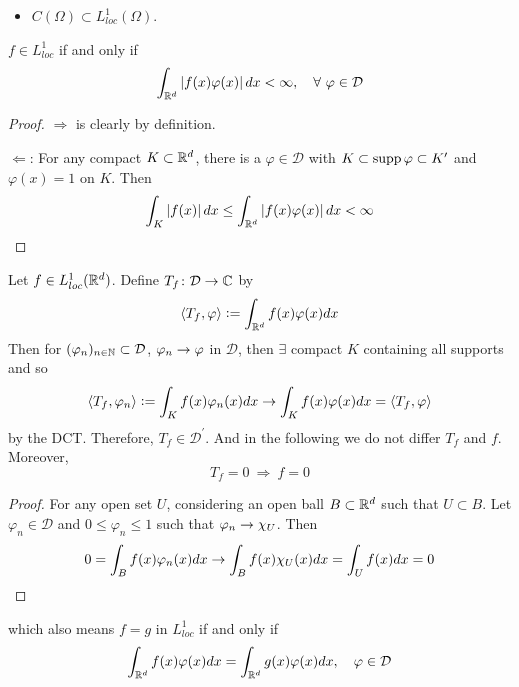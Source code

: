\begin{enumerate}[label=\arabic*.]
\begin{exam}
\begin{itemize}
			\item $C(\Omega) \subset L^1_{loc}(\Omega)$.
		\end{itemize}
		\begin{prop}
			$f \in L^1_{loc}$ if and only if
			\begin{equation*}
				\int_{\mathbb{R}^d}\left\lvert f(x)\varphi(x)\right\lvert dx < \infty,\quad \forall~\varphi \in \mathcal{D}
			\end{equation*}
		\end{prop}
		\begin{proof}
			$\Rightarrow$ is clearly by definition.

			\noindent $\Leftarrow$: For any compact $K \subset \mathbb{R}^d$, there is a $\varphi \in \mathcal{D}$ with $K \subset \operatorname{supp} \varphi \subset K^\prime$ and $\varphi(x) = 1$ on $K$. Then
			\begin{equation*}
				\int_K \left\lvert f(x)\right\lvert dx \leq \int_{\mathbb{R}^d} \left\lvert f(x)\varphi(x)\right\lvert dx < \infty
			\end{equation*}
		\end{proof}

		Let $f \in L^1_{loc}(\mathbb{R}^d)$. Define $T_f \colon \mathcal{D} \rightarrow \mathbb{C}$ by
		\begin{equation*}
			\langle T_f, \varphi \rangle \vcentcolon= \int_{\mathbb{R}^d} f(x)\varphi(x) dx
		\end{equation*}
		Then for $(\varphi_n)_{n \in \mathbb{N}} \subset \mathcal{D}$, $\varphi_n \rightarrow \varphi$ in $\mathcal{D}$, then $\exists$ compact $K$ containing all supports and so
		\begin{equation*}
			\langle T_f, \varphi_n \rangle \vcentcolon= \int_{K} f(x)\varphi_n(x) dx \rightarrow  \int_{K} f(x)\varphi(x) dx = \langle T_f, \varphi \rangle
		\end{equation*}
		by the DCT. Therefore, $T_f \in \mathcal{D}^\prime$. And in the following we do not differ $T_f$ and $f$. Moreover,
		\begin{equation*}
			T_f = 0 ~\Rightarrow~f = 0
		\end{equation*}
		\begin{proof}
			For any open set $U$, considering an open ball $B \subset \mathbb{R}^d$ such that $U \subset B$. Let $\varphi_n \in \mathcal{D}$ and $0 \leq \varphi_n \leq 1$ such that $\varphi_n \rightarrow \chi_U$. Then
			\begin{equation*}
				0 = \int_B f(x)\varphi_n(x)dx \rightarrow \int_B f(x)\chi_U(x)dx = \int_U f(x)dx = 0
			\end{equation*}
		\end{proof}
		which also means $f = g$ in $L^1_{loc}$ if and only if
		\begin{equation*}
			\int_{\mathbb{R}^d} f(x)\varphi(x) dx = \int_{\mathbb{R}^d} g(x)\varphi(x) dx,\quad \varphi \in \mathcal{D}
		\end{equation*}
	\end{exam}
	

\end{enumerate}
